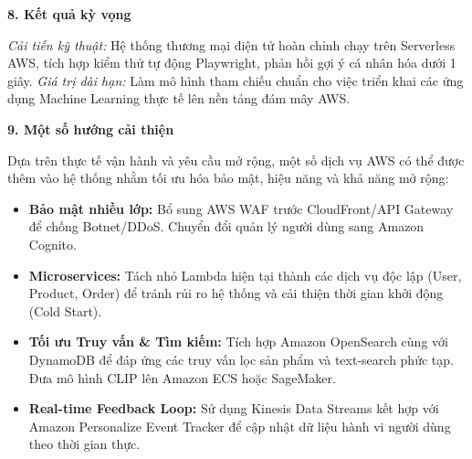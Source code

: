 \vspace{0.5em}\noindent\textbf{8. Kết quả kỳ
vọng}\par

\emph{Cải tiến kỹ thuật:} Hệ thống thương mại điện tử hoàn chỉnh chạy
trên Serverless AWS, tích hợp kiểm thử tự động Playwright, phản hồi gợi
ý cá nhân hóa dưới 1 giây. \emph{Giá trị dài hạn:} Làm mô hình tham
chiếu chuẩn cho việc triển khai các ứng dụng Machine Learning thực tế
lên nền tảng đám mây AWS.

\vspace{0.5em}\noindent\textbf{9. Một số hướng cải
thiện}\par

Dựa trên thực tế vận hành và yêu cầu mở rộng, một số dịch vụ AWS có thể
được thêm vào hệ thống nhằm tối ưu hóa bảo mật, hiệu năng và khả năng mở
rộng:

\begin{itemize}
\tightlist
\item
  \textbf{Bảo mật nhiều lớp:} Bổ sung AWS WAF trước CloudFront/API
  Gateway để chống Botnet/DDoS. Chuyển đổi quản lý người dùng sang
  Amazon Cognito.
\item
  \textbf{Microservices:} Tách nhỏ Lambda hiện tại thành các dịch vụ độc
  lập (User, Product, Order) để tránh rủi ro hệ thống và cải thiện thời
  gian khởi động (Cold Start).
\item
  \textbf{Tối ưu Truy vấn \& Tìm kiếm:} Tích hợp Amazon OpenSearch cùng
  với DynamoDB để đáp ứng các truy vấn lọc sản phẩm và text-search phức
  tạp. Đưa mô hình CLIP lên Amazon ECS hoặc SageMaker.
\item
  \textbf{Real-time Feedback Loop:} Sử dụng Kinesis Data Streams kết hợp
  với Amazon Personalize Event Tracker để cập nhật dữ liệu hành vi người
  dùng theo thời gian thực.
\end{itemize}
